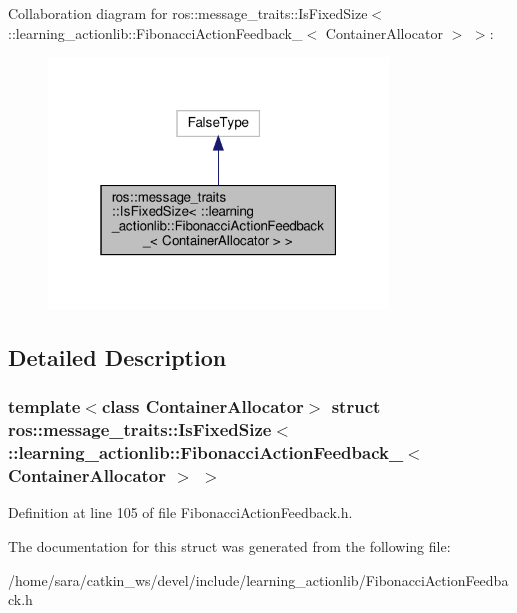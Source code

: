 Collaboration diagram for ros\+:\+:message\+\_\+traits\+:\+:Is\+Fixed\+Size$<$ \+:\+:learning\+\_\+actionlib\+:\+:Fibonacci\+Action\+Feedback\+\_\+$<$ Container\+Allocator $>$ $>$\+:
\nopagebreak
\begin{figure}[H]
\begin{center}
\leavevmode
\includegraphics[width=256pt]{structros_1_1message__traits_1_1IsFixedSize_3_01_1_1learning__actionlib_1_1FibonacciActionFeedbaebf4c40c7e18cf5ed0be2176183fa9eb}
\end{center}
\end{figure}


\subsection{Detailed Description}
\subsubsection*{template$<$class Container\+Allocator$>$\newline
struct ros\+::message\+\_\+traits\+::\+Is\+Fixed\+Size$<$ \+::learning\+\_\+actionlib\+::\+Fibonacci\+Action\+Feedback\+\_\+$<$ Container\+Allocator $>$ $>$}



Definition at line 105 of file Fibonacci\+Action\+Feedback.\+h.



The documentation for this struct was generated from the following file\+:\begin{DoxyCompactItemize}
\item 
/home/sara/catkin\+\_\+ws/devel/include/learning\+\_\+actionlib/Fibonacci\+Action\+Feedback.\+h\end{DoxyCompactItemize}
